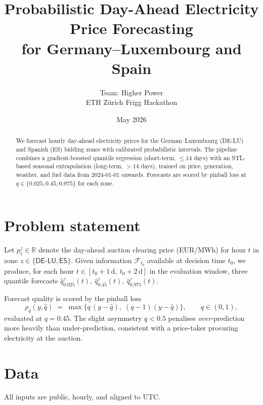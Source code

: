 \documentclass[11pt,a4paper]{article}
\title{Probabilistic Day-Ahead Electricity Price Forecasting\\
       for Germany--Luxembourg and Spain}
\author{Team: Higher Power\\ ETH Z\"urich Frigg Hackathon}
\date{May 2026}
\newcommand{\DELU}{\textsf{DE-LU}}
\newcommand{\ES}{\textsf{ES}}
\begin{document}
\maketitle

\begin{abstract}
\noindent
We forecast hourly day-ahead electricity prices for the German--Luxembourg
(\DELU) and Spanish (\ES) bidding zones with calibrated probabilistic
intervals. The pipeline combines a gradient-boosted quantile regression
(short-term, $\le 14$ days) with an STL-based seasonal extrapolation
(long-term, $> 14$ days), trained on price, generation, weather, and fuel
data from 2024-01-01 onwards. Forecasts are scored by pinball loss at
$q \in \{0.025, 0.45, 0.975\}$ for each zone.
\end{abstract}

\section{Problem statement}
\label{sec:problem}

Let $p_t^z \in \mathbb{R}$ denote the day-ahead auction clearing price
(EUR/MWh) for hour $t$ in zone $z \in \{\DELU, \ES\}$. Given information
$\mathcal{F}_{t_0}$ available at decision time $t_0$, we produce, for
each hour $t \in [t_0+1\,\mathrm{d},\ t_0+2\,\mathrm{d}]$ in the
evaluation window, three quantile forecasts
$\hat{q}_{0.025}^z(t),\ \hat{q}_{0.45}^z(t),\ \hat{q}_{0.975}^z(t)$.

Forecast quality is scored by the pinball loss
\begin{equation}
  \rho_q(y,\hat{q})
  \;=\; \max\bigl\{q\,(y - \hat{q}),\; (q-1)(y - \hat{q})\bigr\},
  \qquad q \in (0,1),
  \label{eq:pinball}
\end{equation}
evaluated at $q = 0.45$. The slight asymmetry $q < 0.5$ penalises
\emph{over}-prediction more heavily than under-prediction, consistent
with a price-taker procuring electricity at the auction.

\section{Data}
\label{sec:data}

All inputs are public, hourly, and aligned to UTC.
\end{document}
